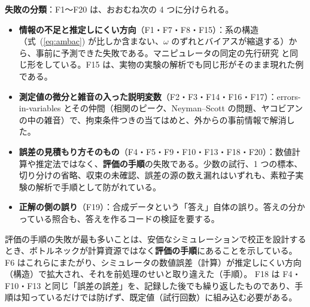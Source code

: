 \documentclass[paper=a4paper,fontsize=10pt,twocolumn,column_gap=2zw,line_length=24zw,number_of_lines=46,head_space=20mm]{jlreq}
\begin{document}
\textbf{失敗の分類}：F1〜F20 は、おおむね次の 4 つに分けられる。
\begin{itemize}\setlength{\itemsep}{0pt}
\item \textbf{情報の不足と推定しにくい方向}（F1・F7・F8・F15）：系の構造（式~(\ref{eq:ambac}) が比しか含まない、$\omega$ のずれとバイアスが縮退する）から、事前に予測できた失敗である。マニピュレータの同定の先行研究 \cite{gautier1990} と同じ形をしている。F15 は、実物の実験の解析でも同じ形がそのまま現れた例である。
\item \textbf{測定値の微分と雑音の入った説明変数}（F2・F3・F14・F16・F17）：errors-in-variables とその仲間（相関のピーク、Neyman--Scott の問題、ヤコビアンの中の雑音）で、拘束条件つきの当てはめと、外からの事前情報で解消した。
\item \textbf{誤差の見積もり方そのもの}（F4・F5・F9・F10・F13・F18・F20）：数値計算や推定法ではなく、\textbf{評価の手順}の失敗である。少数の試行、1 つの標本、切り分けの省略、収束の未確認、誤差の源の数え漏れはいずれも、素粒子実験の解析で手順として防がれている。
\item \textbf{正解の側の誤り}（F19）：合成データという「答え」自体の誤り。答えの分かっている照合も、答えを作るコードの検証を要する。
\end{itemize}
評価の手順の失敗が最も多いことは、安価なシミュレーションで校正を設計するとき、ボトルネックが計算資源ではなく\textbf{評価の手順}にあることを示している。
F6 はこれらにまたがり、シミュレータの数値誤差（計算）が推定しにくい方向（構造）で拡大され、それを前処理のせいと取り違えた（手順）。
F18 は F4・F10・F13 と同じ「誤差の誤差」を、記録した後でも繰り返したものであり、手順は知っているだけでは防げず、既定値（試行回数）に組み込む必要がある。
\end{document}
